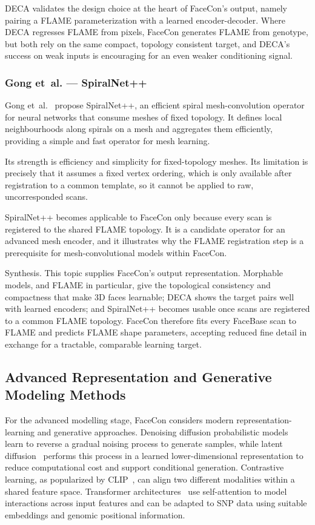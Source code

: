 DECA validates the design choice at the heart of FaceCon's output, namely pairing a FLAME parameterization with a learned encoder-decoder. Where DECA regresses FLAME from pixels, FaceCon generates FLAME from genotype, but both rely on the same compact, topology consistent target, and DECA's success on weak inputs is encouraging for an even weaker conditioning signal.

\subsubsection{Gong et~al. --- SpiralNet++}
Gong et~al.~\cite{ref:spiralnet} propose SpiralNet++, an efficient spiral mesh-convolution operator for neural networks that consume meshes of fixed topology. It defines local neighbourhoods along spirals on a mesh and aggregates them efficiently, providing a simple and fast operator for mesh learning.

Its strength is efficiency and simplicity for fixed-topology meshes. Its limitation is precisely that it assumes a fixed vertex ordering, which is only available after registration to a common template, so it cannot be applied to raw, uncorresponded scans.

SpiralNet++ becomes applicable to FaceCon only because every scan is registered to the shared FLAME topology. It is a candidate operator for an advanced mesh encoder, and it illustrates why the FLAME registration step is a prerequisite for mesh-convolutional models within FaceCon.

Synthesis. This topic supplies FaceCon's output representation. Morphable models, and FLAME in particular, give the topological consistency and compactness that make 3D faces learnable; DECA shows the target pairs well with learned encoders; and SpiralNet++ becomes usable once scans are registered to a common FLAME topology. FaceCon therefore fits every FaceBase scan to FLAME and predicts FLAME shape parameters, accepting reduced fine detail in exchange for a tractable, comparable learning target.

\subsection{Advanced Representation and Generative Modeling Methods}
For the advanced modelling stage, FaceCon considers modern representation-learning and generative approaches. Denoising diffusion probabilistic models~\cite{ref:ddpm} learn to reverse a gradual noising process to generate samples, while latent diffusion~\cite{ref:ldm} performs this process in a learned lower-dimensional representation to reduce computational cost and support conditional generation. Contrastive learning, as popularized by CLIP~\cite{ref:clip}, can align two different modalities within a shared feature space. Transformer architectures~\cite{ref:transformer} use self-attention to model interactions across input features and can be adapted to SNP data using suitable embeddings and genomic positional information.

